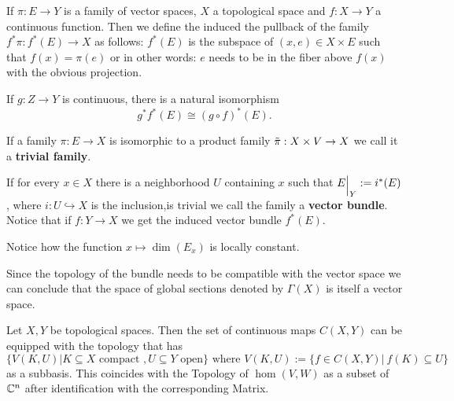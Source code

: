 \begin{definition} \label{def: Pullback of a family of vector spaces}
	If $\pi:E\to Y$ is a family of vector spaces, $X$ a topological space and $f:X\to Y  $ a continuous function. Then we define the induced the pullback of the family $f^*{\pi}:f^*(E) \to X$ as follows: 
	$f^*(E)$ is the subspace of $(x,e)\in X\times E$ such that $f(x)=\pi(e)$ or in other words: $e$ needs to be in the fiber above $f(x)$ with the obvious projection.
\end{definition}
\begin{cor} \label{cor: pullback is functoriell}
	If $g:Z\to Y$ is continuous, there is a natural isomorphism $$g^*f^*(E)\cong (g\circ f)^*(E).$$ 
\end{cor}
\begin{definition}\label{def: Trivial bundle}
	If a family $\pi: E \to X$ is isomorphic to a product family $\Tilde{\pi}:X\times V\to X$ we call it a \textbf{trivial family}.
\end{definition}
\begin{definition}\label{def: Vector bundle}
	If for every $x\in X$ there is a neighborhood $U$ containing $x$ such that $E\einsch{Y}:=i^*(E)$, where $i:U\hookrightarrow X$ is the inclusion,is trivial we call the family a \textbf{vector bundle}. Notice that if $f:Y\to X$ we get the induced vector bundle $f^*(E)$.  
\end{definition}
\begin{cor}
	Notice how the function $x\mapsto \dim(E_x)$ is locally constant.
\end{cor}
\begin{cor}
	Since the topology of the bundle needs to be compatible with the vector space we can conclude that the space of global sections denoted by $\Gamma(X)$ is itself a vector space.
\end{cor}
\begin{definition}
	Let $X,Y$ be topological spaces. Then the set of continuous maps $C(X,Y)$ can be equipped with the topology that has 
	\begin{equation*}
		\{V(K,U)|K\subseteq X \text{ compact }, U\subseteq Y \text{ open}\} \text{ where }V(K,U):=\{f\in C(X,Y) |~f(K)\subseteq U\}
	\end{equation*} as a subbasis. This coincides with the Topology of $\hom(V,W)$ as a subset of $\mathbb{C}^n$ after identification with the corresponding Matrix.
\end{definition}
